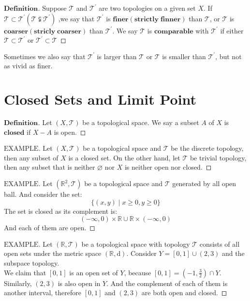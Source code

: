 \documentclass[a4paper, 11pt]{article}
\theoremstyle{remark}
\newenvironment{mydef}
{\renewcommand\qedsymbol{$ $}\begin{proof}[$\mathbf{Definition}$]}
  {\end{proof}}
\newenvironment{myexam}
{\renewcommand\qedsymbol{$ $}\begin{proof}[$\mathrm{EXAMPLE}$]}
  {\end{proof}}
\theoremstyle{definition}
\begin{document}
\vspace{0.5cm}
\begin{mydef}
        Suppose $\mathcal{T}$ and $\mathcal{T}^{'}$ are two topologies on a given set
        $X$. If $\mathcal{T}\subset\mathcal{T}^{'}(\mathcal{T}\subsetneqq\mathcal{T}^{'})$
        ,we say that $\mathcal{T}^{'}$ is  
        $\bm{finer}(\bm{strictly\;finner})$ than $\mathcal{T}$, or $\mathcal{T}$ is 
        $\bm{coarser}(\bm{stricly\;coarser})$ than $\mathcal{T}^{'}$. We say
        $\mathcal{T}$ is $\bm{comparable}$ with $\mathcal{T}^{'}$ if either
        $\mathcal{T}\subset \mathcal{T}^{'}$ or $\mathcal{T}^{'}\subset \mathcal{T}$
\end{mydef}
Sometimes we also say that $\mathcal{T}^{'}$ is larger than $\mathcal{T}$ or $\mathcal{T}$
is smaller than $\mathcal{T}^{'}$, but not as vivid as finer.

\section{Closed Sets and Limit Point}
\begin{mydef}
        Let $(X,\mathcal{T})$ be a topological space. We say a subset $A$ of $X$ is 
        $\bm{closed}$ if $X-A$ is open.
\end{mydef}

\begin{myexam}
        Let $(X,\mathcal{T})$ be a topological space and $\mathcal{T}$ be the discrete 
        topology, then any subset of $X$ is a closed set. On the other hand, let
        $\mathcal{T}$ be trivial topology, then any subset that is neither $\varnothing$
        nor $X$ is neither open nor closed.
\end{myexam}

\begin{myexam}
        Let $(\mathbb{R}^{2},\mathcal{T})$ be a topological space and $\mathcal{T}$ 
        generated by all open ball. And consider the set:
        $$
        \{(x,y)\mid x\ge 0,y\ge 0\}
        $$The set is closed as its complement is:
        $$
        (-\infty,0)\times \mathbb{R}\cup \mathbb{R}\times(-\infty,0)
        $$ And each of them are open.
\end{myexam}

\begin{myexam}
        Let $(\mathbb{R}, \mathcal{T})$ be a topological space with topology $\mathcal{T}$
        consists of all open sets under the metric space $(\mathbb{R}, \mathrm{d})$.
        Consider $Y=[0,1]\cup(2,3)$ and the subspace topology.\\
        We claim that $[0,1]$ is an open set of $Y$, because $[0,1]=(-1,\frac{3}{2})\cap
        Y$. Similarly, $(2,3)$ is also open in $Y$. And the complement of each of them is
        another interval, therefore $[0,1]$ and $(2,3)$ are both open and closed.
\end{myexam}
\end{document}
